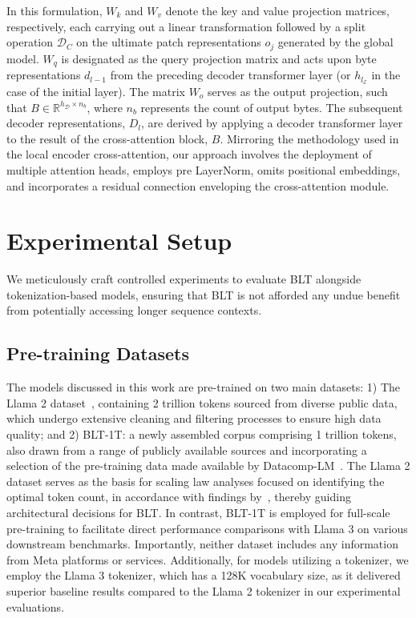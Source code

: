 In this formulation, $W_k$ and $W_v$ denote the key and value projection matrices, respectively, each carrying out a linear transformation followed by a split operation $\mathcal{D}_C$ on the ultimate patch representations $o_j$ generated by the global model. $W_q$ is designated as the query projection matrix and acts upon byte representations $d_{l-1}$ from the preceding decoder transformer layer (or $h_{l_{\mathcal{E}}}$ in the case of the initial layer). The matrix $W_o$ serves as the output projection, such that $B \in \mathbb{R}^{h_{\mathcal{D}} \times n_b}$, where $n_b$ represents the count of output bytes. The subsequent decoder representations, $D_l$, are derived by applying a decoder transformer layer to the result of the cross-attention block, $B$. Mirroring the methodology used in the local encoder cross-attention, our approach involves the deployment of multiple attention heads, employs pre LayerNorm, omits positional embeddings, and incorporates a residual connection enveloping the cross-attention module.

\section{Experimental Setup}
\label{section:experiments}
We meticulously craft controlled experiments to evaluate {\textsc BLT} alongside tokenization-based models, ensuring that {\textsc BLT} is not afforded any undue benefit from potentially accessing longer sequence contexts.

\subsection{Pre-training Datasets} The models discussed in this work are pre-trained on two main datasets: 1) The Llama 2 dataset~\citep{touvron2023llama}, containing 2 trillion tokens sourced from diverse public data, which undergo extensive cleaning and filtering processes to ensure high data quality; and 2) {\textsc BLT}-1T: a newly assembled corpus comprising 1 trillion tokens, also drawn from a range of publicly available sources and incorporating a selection of the pre-training data made available by Datacomp-LM~\citep{li2024datacomp}. The Llama 2 dataset serves as the basis for scaling law analyses focused on identifying the optimal token count, in accordance with findings by~\cite{dubey2024llama}, thereby guiding architectural decisions for {\textsc BLT}. In contrast, {\textsc BLT}-1T is employed for full-scale pre-training to facilitate direct performance comparisons with Llama 3 on various downstream benchmarks. Importantly, neither dataset includes any information from Meta platforms or services. Additionally, for models utilizing a tokenizer, we employ the Llama 3 tokenizer, which has a 128K vocabulary size, as it delivered superior baseline results compared to the Llama 2 tokenizer in our experimental evaluations.

